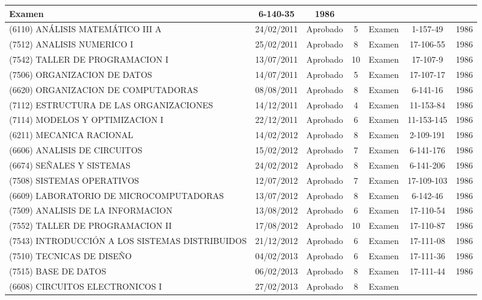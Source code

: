 \documentclass[a4paper,10pt]{article}
\begin{document}
\begin{center}
\begin{longtable}{|p{3.5cm}|c|c|c|p{1.4cm}|c|c|}
			Examen & 6-140-35 & 1986 \\
			\hline
			(6110) ANÁLISIS MATEMÁTICO III A & 24/02/2011 & Aprobado & 5 & 
			Examen & 1-157-49 & 1986 \\
			\hline
			(7512) ANALISIS NUMERICO I & 25/02/2011 & Aprobado & 8 & Examen & 
			17-106-55 & 1986 \\
			\hline
			(7542) TALLER DE PROGRAMACION I & 13/07/2011 & Aprobado & 10 & 
			Examen & 17-107-9 & 1986 \\
			\hline
			(7506) ORGANIZACION DE DATOS & 14/07/2011 & Aprobado & 5 & Examen & 
			17-107-17 & 1986 \\
			\hline
			(6620) ORGANIZACION DE COMPUTADORAS & 08/08/2011 & Aprobado & 8 & 
			Examen & 6-141-16 & 1986 \\
			\hline
			(7112) ESTRUCTURA DE LAS ORGANIZACIONES & 14/12/2011 & Aprobado & 4 
			& Examen & 11-153-84 & 1986 \\
			\hline
			(7114) MODELOS Y OPTIMIZACION I & 22/12/2011 & Aprobado & 6 & Examen
			& 11-153-145 & 1986 \\
			\hline
			(6211) MECANICA RACIONAL & 14/02/2012 & Aprobado & 8 & Examen & 
			2-109-191 & 1986 \\
			\hline
			(6606) ANALISIS DE CIRCUITOS & 15/02/2012 & Aprobado & 7 & Examen &
			6-141-176 & 1986 \\
			\hline
			(6674) SEÑALES Y SISTEMAS & 24/02/2012 & Aprobado & 8 & Examen & 
			6-141-206 & 1986 \\
			\hline
			(7508) SISTEMAS OPERATIVOS & 12/07/2012 & Aprobado & 7 & Examen & 
			17-109-103 & 1986 \\
			\hline
			(6609) LABORATORIO DE MICROCOMPUTADORAS & 13/07/2012 & Aprobado & 8
			& Examen & 6-142-46 & 1986 \\
			\hline
			(7509) ANALISIS DE LA INFORMACION & 13/08/2012 & Aprobado & 6 & 
			Examen & 17-110-54 & 1986 \\
			\hline
			(7552) TALLER DE PROGRAMACION II & 17/08/2012 & Aprobado & 10 & 
			Examen & 17-110-87 & 1986 \\
			\hline
			(7543) INTRODUCCIÓN A LOS SISTEMAS DISTRIBUIDOS	& 21/12/2012 & 
            Aprobado & 6 & Examen & 17-111-08 & 1986 \\
			\hline
			(7510) TECNICAS DE DISEÑO & 04/02/2013 & Aprobado & 6 & Examen & 
			17-111-36 & 1986 \\
			\hline
			(7515) BASE DE DATOS & 06/02/2013 & Aprobado & 8 & Examen & 
			17-111-44 & 1986 \\
			\hline
			(6608) CIRCUITOS ELECTRONICOS I & 27/02/2013 & Aprobado & 8 & Examen

\end{longtable}
\end{center}
\end{document}

